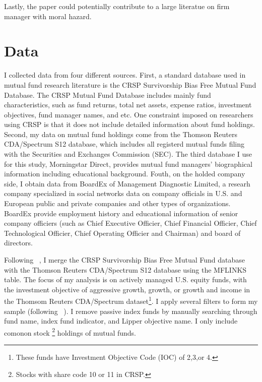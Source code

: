 \documentclass[11pt]{article}
\begin{document}
\begin{doublespace}
Lastly, the paper could potentially contribute to a large literatue on firm manager with moral hazard. 



\section{Data}
I collected data from four different sources. First, a standard database used in mutual fund research literature is the CRSP Survivorship Bias Free Mutual Fund Database. The CRSP Mutual Fund Database includes mainly fund characteristics, such as fund returns, total net assets, expense ratios, investment objectives, fund manager names, and etc. One constraint imposed on researchers using CRSP is that it does not include detailed information about fund holdings. 
Second, my data on mutual fund holdings come from the Thomson Reuters CDA/Spectrum S12 database, which includes all registerd mutual funds filing with the Securities and Exchanges Commission (SEC). The third database I use for this study, Morningstar Direct, provides mutual fund managers' biographical information including educational background. Fouth, on the holded company side, I obtain data from BoardEx of Management Diagnostic Limited, a researh company specialized in social networks data on company officials in U.S. and European public and private companies and other types of organizations. BoardEx provide employment history and educational information of senior company officiers (such as Chief Executive Officier, Chief Financial Officier, Chief Technological Officier, Chief Operating Officier and Chairman) and board of directors. 

Following ~\cite{wermers2000mutual}, I merge the CRSP Survivorship Bias Free Mutual Fund database with the Thomson Reuters CDA/Spectrum S12 database using the MFLINKS table. The focus of my analysis is on actively managed U.S. equity funds, with the investment objective of aggressive growth, growth, or growth and income in the Thomsom Reuters CDA/Spectrum dataset\footnote{These funds have Investment Objective Code (IOC) of 2,3,or 4.}. 
I apply several filters to form my sample (following ~\cite{kacperczyk2006unobserved}). I remove passive index funds by manually searching through fund name, index fund indicator, and Lipper objective name. I only include comonon stock \footnote{Stocks with share code 10 or 11 in CRSP. } holdings of mutual funds. 


\end{doublespace}
\end{document}
